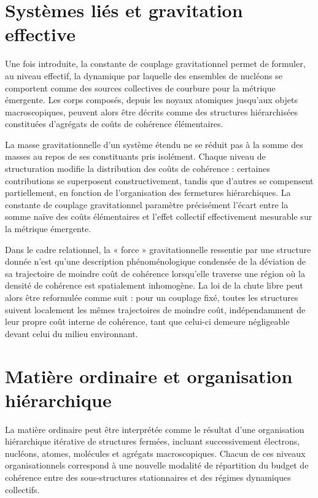 \documentclass[11pt,a4paper]{article}
\begin{document}
\section{Systèmes liés et gravitation effective}

Une fois introduite, la constante de couplage gravitationnel permet de formuler, au niveau effectif, la dynamique par laquelle des ensembles de nucléons se comportent comme des sources collectives de courbure pour la métrique émergente. Les corps composés, depuis les noyaux atomiques jusqu’aux objets macroscopiques, peuvent alors être décrits comme des structures hiérarchisées constituées d’agrégats de coûts de cohérence élémentaires. 

La masse gravitationnelle d’un système étendu ne se réduit pas à la somme des masses au repos de ses constituants pris isolément. Chaque niveau de structuration modifie la distribution des coûts de cohérence : certaines contributions se superposent constructivement, tandis que d’autres se compensent partiellement, en fonction de l’organisation des fermetures hiérarchiques. La constante de couplage gravitationnel paramètre précisément l’écart entre la somme naïve des coûts élémentaires et l’effet collectif effectivement mesurable sur la métrique émergente. 

Dans le cadre relationnel, la « force » gravitationnelle ressentie par une structure donnée n’est qu’une description phénoménologique condensée de la déviation de sa trajectoire de moindre coût de cohérence lorsqu’elle traverse une région où la densité de cohérence est spatialement inhomogène. La loi de la chute libre peut alors être reformulée comme suit : pour un couplage fixé, toutes les structures suivent localement les mêmes trajectoires de moindre coût, indépendamment de leur propre coût interne de cohérence, tant que celui-ci demeure négligeable devant celui du milieu environnant.

\section{Matière ordinaire et organisation hiérarchique}

La matière ordinaire peut être interprétée comme le résultat d’une organisation hiérarchique itérative de structures fermées, incluant successivement électrons, nucléons, atomes, molécules et agrégats macroscopiques. Chacun de ces niveaux organisationnels correspond à une nouvelle modalité de répartition du budget de cohérence entre des sous-structures stationnaires et des régimes dynamiques collectifs. 
\end{document}
